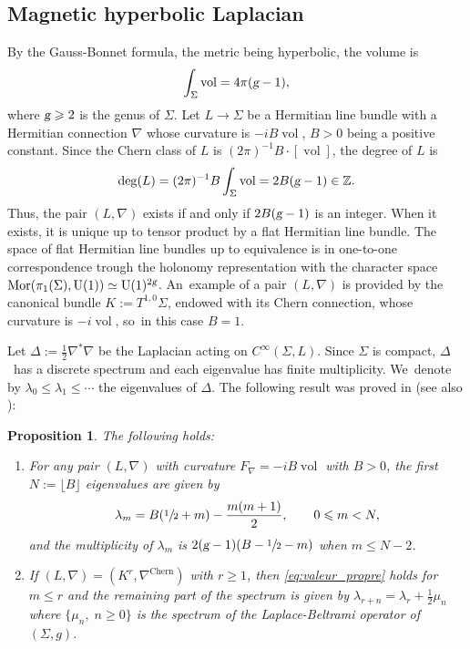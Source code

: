 \documentclass[JEP,XML,SOM,Unicode,published]{cedram}
\theoremstyle{plain}
\newtheorem{proposition}[theorem]{Proposition}
\theoremstyle{definition}
\let\op\operatorname
\newcommand{\Z}{\mathbb{Z}}
\let\la\lambda
\let\Si\Sigma
\DeclareMathOperator{\vol}{vol}
\begin{document}
\subsection{Magnetic hyperbolic Laplacian} \label{ssection:landau} By the Gauss-Bonnet formula, the metric being
hyperbolic, the volume is
\begin{equation}
\int_{\Si} \vol = 4 \pi (\textsl{g} -1),
\end{equation}
where $\textsl{g}\geqslant
2 $ is the genus of $\Si$. Let $L \to \Sigma$ be a Hermitian line bundle with
a Hermitian connection
$\nabla$ whose curvature is $-i B \op{vol}
$, $B > 0$ being a positive constant. Since the Chern class of $L$ is $ (2
\pi)^{-1} B \cdot [ \op{vol}]$, the
degree of $L$ is
\begin{equation}
\label{equation:deg}
\mathrm{deg}(L) = (2 \pi)^{-1} B \int_{\Si} \vol = 2 B (\textsl{g}-1) \in \Z.
\end{equation}
Thus, the pair $(L,
\nabla)$ exists if and only if $2 B (\textsl{g}-1)$ is an integer. When it exists, it
is unique up to tensor product by a flat Hermitian line bundle. The
space of flat Hermitian line bundles up to equivalence is in one-to-one
correspondence trough the holonomy representation with the character space
$\op{Mor} (\pi_1 (\Si), \op{U}(1)) \simeq \op{U} (1)^{2\textsl{g}}$. An~example of a pair $(L, \nabla)$ is provided by the canonical bundle $K := T^{1,0} \Si$,
endowed with its Chern connection, whose curvature is $- i \vol$, so~in this
case $B=1$.

Let $\Delta := \frac{1}{2} \nabla^* \nabla $ be the Laplacian acting on $C^\infty
(\Si, L)$. Since $\Si$ is compact, $\Delta$~has a discrete spectrum and each
eigenvalue has finite multiplicity. We~denote by $\la_0 \leqslant \la_1
\leqslant \cdots $ the eigenvalues of $\Delta$. The following result was
proved in \cite{Iengo-Li-94} (see also \cite{Tejero-06, Landau2}):

\begin{proposition} \label{theo:Landau_Level}
The following holds:
\begin{enumerate}

\item For any pair $(L, \nabla)$ with curvature $F_\nabla=-iB
\op{vol}$ with $B>0$, the first $N := \lfloor B \rfloor $ eigenvalues are
given by
\begin{gather} \label{eq:valeur_propre}
\la_{m } = B (\sfrac{1}{2} + m) - \dfrac{ m (m+1) } {2},\qquad 0
\leqslant m < N,
\end{gather}
and the multiplicity of $\la_m$ is $2 (\textsl{g}-1)(B-\sfrac{1}{2} - m)$ when $m \leqslant N- 2$.

\item If $(L,\nabla) = (K^r,\nabla^{\mathrm{Chern}})$ with $ r \geq 1$, then \eqref{eq:valeur_propre} holds for
$m \leqslant r$ and the remaining part of the spectrum is given by
$\la_{r+n} = \la_r + \frac{1}{2} \mu_n$ where $\{ \mu_n, \; n \geq 0 \}$ is the
spectrum of the Laplace-Beltrami operator of $(\Sigma, g)$.
\end{enumerate}
\end{proposition}
\end{document}
